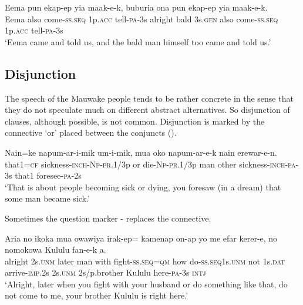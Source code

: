 \ea%
\label{ex:x1380}
\gll Eema  pun  ekap-ep  yia  maak-e-k,    buburia  ona pun  ekap-ep  yia  maak-e-k. \\
Eema  also  come-\textsc{ss}.\textsc{seq}  1p.\textsc{acc}  tell-\textsc{pa}-3s  alright  bald  3s.\textsc{gen} also  come-\textsc{ss}.\textsc{seq}  1p.\textsc{acc}  tell-\textsc{pa}-3s     \\
\glt`Eema came and told us, and the bald man himself too came and told us.'
\z


\subsection{Disjunction}

The speech of the Mauwake people tends to be rather concrete in the sense that they do not speculate much on different abstract alternatives. So disjunction of clauses, although possible, is not common. Disjunction is marked by the connective  `or' placed between the conjuncts (). 

\ea%
\label{ex:x1385}
\gll Nain=ke  napum-ar-i-mik    um-i-mik,  mua  oko napum-ar-e-k  nain  erewar-e-n. \\
that1=\textsc{cf}  sickness-\textsc{inch}-\textsc{Np}-\textsc{pr}.1/3p  or  die-\textsc{Np}-\textsc{pr}.1/3p  man  other sickness-\textsc{inch}-\textsc{pa}-3s  that1  foresee-\textsc{pa}-2s     \\
\glt`That is about people becoming sick or dying, you foresaw (in a dream) that some man became sick.'
\z


Sometimes the question marker -  replaces the connective.

\ea%
\label{ex:x1387}
\gll Aria  no  ikoka  mua  owawiya  irak-ep=  kamenap  on-ap  yo  me  efar  kerer-e,  no nomokowa  Kululu  fan-e-k  a.\\
 alright  2s.\textsc{unm}  later  man  with  fight-\textsc{ss}.\textsc{seq}=\textsc{qm}  how do-\textsc{ss}.\textsc{seq}1s.\textsc{unm}  not  1s.\textsc{dat}  arrive-\textsc{imp}.2s  2s.\textsc{unm} 2s/p.brother  Kululu  here-\textsc{pa}-3s  \textsc{intj}\\
\glt`Alright, later when you fight with your husband or do something like that, do not come to me, your brother Kululu is right here.'
\z



